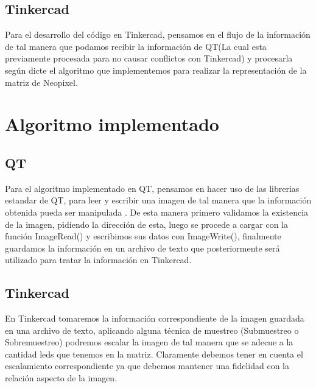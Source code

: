 \documentclass{article}
\begin{document}
    
    \subsection{Tinkercad}
    \begin{flushleft}
        Para el desarrollo del código en Tinkercad, pensamos en el flujo de la información de tal manera que podamos recibir la información de QT(La cual esta previamente procesada para no causar conflictos con Tinkercad) y procesarla según dicte el algoritmo que implementemos para realizar la representación de la matriz de Neopixel. 
    \end{flushleft}
        
    
\section{Algoritmo implementado}
\label{implementado}
    \begin{flushleft}
        
    \subsection{QT}
    Para el algoritmo implementado en QT,  pensamos en hacer uso de las librerias estandar de QT, para leer y escribir una imagen de tal manera que la información obtenida pueda ser manipulada . De esta manera primero validamos la existencia de la imagen, pidiendo la dirección de esta, luego se procede a cargar con la función ImageRead() y escribimos sus datos con ImageWrite(), finalmente guardamos la información en un  archivo de texto que posteriormente será utilizado para tratar la información en Tinkercad.  
    
    \end{flushleft}

    \vspace*{0.5cm}
    
    \subsection{Tinkercad}
    \begin{flushleft}
    En Tinkercad tomaremos la información correspondiente de la imagen guardada en una archivo de texto, aplicando alguna técnica de muestreo (Submuestreo o Sobremuestreo) podremos escalar la imagen de tal manera que se adecue a la cantidad leds que tenemos en la matriz. Claramente debemos tener en cuenta el escalamiento correspondiente ya que debemos mantener una fidelidad con la relación aspecto de la imagen.    
    
    \end{flushleft}
    
\end{document}
